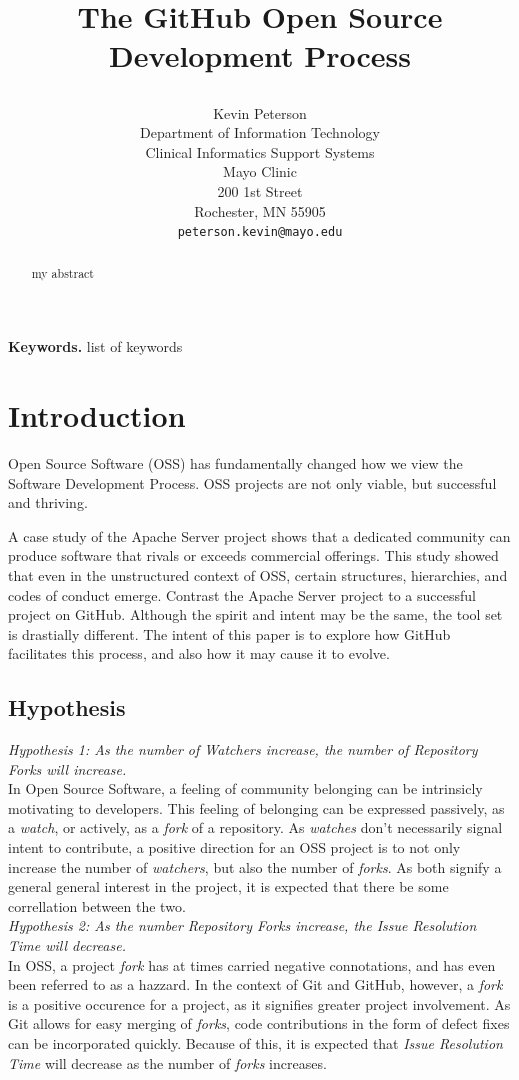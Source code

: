 \documentclass{proc}
\title{
The GitHub Open Source Development Process
\author{Kevin Peterson\\
Department of Information Technology\\
Clinical Informatics Support Systems\\
Mayo Clinic\\
200 1st Street\\
Rochester, MN  55905\\
\small \texttt{peterson.kevin@mayo.edu}
}
}
\date{}
\begin{document}
\maketitle

\begin{abstract}
my abstract
\end{abstract}

\noindent \textbf{Keywords.} list of keywords

\section{Introduction}
Open Source Software (OSS) has fundamentally changed how we view the Software Development Process\cite{raymond1999cathedral}. OSS projects are not only viable, but successful and thriving. 


A case study of the Apache Server project\cite{mockus2000case} shows that a dedicated community can produce software that rivals or exceeds commercial offerings. This study showed that even in the unstructured context of OSS, certain structures, hierarchies, and codes of conduct emerge. Contrast the Apache Server project to a successful project on GitHub. Although the spirit and intent may be the same, the tool set is drastially different. The intent of this paper is to explore how GitHub facilitates this process, and also how it may cause it to evolve.


\subsection{Hypothesis}
\emph{Hypothesis 1: As the number of Watchers increase, the number of Repository Forks will increase.}\\
In Open Source Software, a feeling of community belonging can be intrinsicly motivating to developers\cite{lakhani2003hackers}. This feeling of belonging can be expressed passively, as a \emph{watch}, or actively, as a \emph{fork} of a repository. As \emph{watches} don't necessarily signal intent to contribute, a positive direction for an OSS project is to not only increase the number of \emph{watchers}, but also the number of \emph{forks}. As both signify a general general interest in the project, it is expected that there be some correllation between the two.\\

\emph{Hypothesis 2: As the number Repository Forks increase, the Issue Resolution Time will decrease.}\\
In OSS, a project \emph{fork} has at times carried negative connotations, and has even been referred to as a hazzard\cite{kogut2001open}. In the context of Git and GitHub, however, a \emph{fork} is a positive occurence for a project, as it signifies greater project involvement. As Git allows for easy merging of \emph{forks}, code contributions in the form of defect fixes can be incorporated quickly. Because of this, it is expected that \emph{Issue Resolution Time} will decrease as the number of \emph{forks} increases.\\
\end{document}

